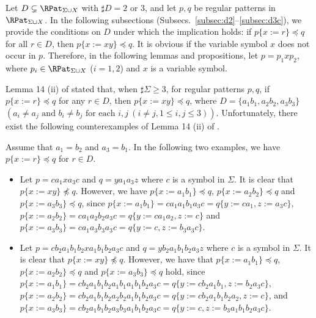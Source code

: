 
Let {\color{black}$D \subsetneq \RPat_{\Sigma\cup X}$} with $\sharp D = 2$ or $3$, and let $p,q$ be regular patterns in {\color{black}$\RPat_{\Sigma\cup X}$}.
In the following subsections (Subsecs.~\ref{subsec:d2}--\ref{subsec:d3c}), we provide the conditions on $D$ under which the implication holds: if $p \{ x := r \} \preceq q$ for all $r \in D$, then $p \{ x := xy \} \preceq q$.
It is obvious if the variable symbol $x$ does not occur in $p$.
Therefore, in the following lemmas and propositions, let $p=p_{1}xp_{2}$, where {\color{black}$p_{i}\in \RPat_{\Sigma\cup X}$} ($i=1,2$) and $x$ is a variable symbol.

{\color{black}
Lemma 14 (ii) of \cite{Sato1} stated that, when $\sharp \Sigma \geq 3$, for regular patterns $p,q$, if $p\{x:=r\}\preceq q$ for any $r\in D$, then $p\{x:=xy\} \preceq q$, where 
$D = \{ a_{1}b_{1}, a_{2}b_{2}, a_{3}b_{3}\}$ $(a_{i} \ne a_{j} \mbox{ and } b_{i} \ne b_{j} \mbox{ for each } i,j~(i\ne j, 1\le i,j\le 3))$.
Unfortunately, there exist the following counterexamples of Lemma 14 (ii) of \cite{Sato1}.
\begin{ex}\label{CounterExample_Lemma14}
Assume that $a_1=b_2$ and $a_3=b_1$.
{\color{black} In the following two examples, we have $p\{x:=r\}\preceq q$ for $r\in D$}.
  
\begin{itemize}
\item[(1)] 
Let $p=ca_1xa_3c$ and $q=ya_1a_3z$ {\color{black} where $c$ is a symbol in $\Sigma$}.
It is clear that $p\{x:=xy\} \not\preceq q$.
However, we have $p\{x:=a_1b_1\}\preceq q$, $p\{x:=a_2b_2\}\preceq q$ and $p\{x:=a_3b_3\}\preceq q$, 
since
$p\{x:=a_1b_1\}=ca_1a_1b_1a_3c=q\{y:=ca_1,z:=a_3c\}$,
$p\{x:=a_2b_2\}=ca_1a_2b_2a_3c=q\{y:=ca_1a_2,z:=c\}$ and 
$p\{x:=a_3b_3\}=ca_1a_3b_3a_3c=q\{y:=c,z:=b_3a_3c\}$.

\item[(2)] 
Let $p=cb_2a_1b_1b_2xa_1b_1b_2a_3c$ and $q=yb_2a_1b_1b_2a_3z$  {\color{black} where $c$ is a symbol in $\Sigma$}.
It is clear that $p\{x:=xy\} \not\preceq q$.
However, we have that $p\{x:=a_1b_1\}\preceq q$, $p\{x:=a_2b_2\} \preceq q$ and $p\{x:=a_3b_3\} \preceq q$ hold, 
since  
$p\{x:=a_1b_1\}=cb_2a_1b_1b_2a_1b_1a_1b_1b_2a_3c=q\{y:=cb_2a_1b_1,z:=b_2a_3c\}$,
$p\{x:=a_2b_2\}=cb_2a_1b_1b_2a_2b_2a_1b_1b_2a_3c=q\{y:=cb_2a_1b_1b_2a_2,z:=c\}$,
and  $p\{x:=a_3b_3\}=cb_2a_1b_1b_2a_3b_3a_1b_1b_2a_3c=q\{y:=c,z:=b_3a_1b_1b_2a_3c\}$.
\end{itemize}
\end{ex}
}

